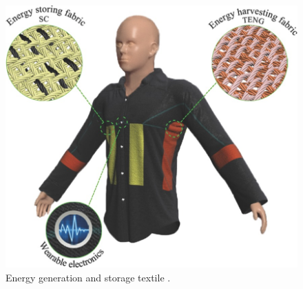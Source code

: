 \begin{figure}[!htb]
\centering
\includegraphics[scale = 6]{images/EnergyFabric.jpg}
\caption{Energy generation and storage textile \cite{Pu2016}.}
\label{fig:EnergyFabric}
\end{figure}

